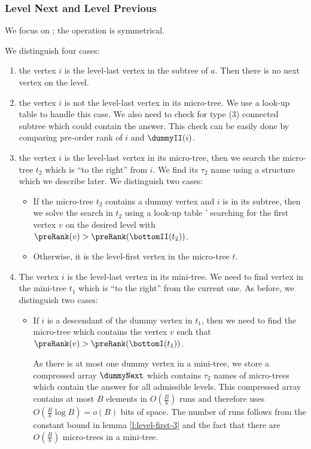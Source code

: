 \subsubsection{Level Next and Level Previous}

We focus on \levelNext{}; the operation \levelPrev{} is symmetrical.

We distinguish four cases:
\begin{enumerate}
	\item the vertex $i$ is the level-last vertex in the subtree of $a$.
	Then there is no next vertex on the level.
	
	\item the vertex $i$ is not the level-last vertex in its micro-tree.
	We use a look-up table to handle this case.
	We also need to check for type (3) connected subtree which could contain the answer.
	This check can be easily done by comparing pre-order rank of $i$ and $\dummyII(i)$.
	
	\item the vertex $i$ is the level-last vertex in its micro-tree, then we search the micro-tree $t_2$ which is ``to the right'' from $i$.
	We find its $\tau_2$ name using a structure which we describe later.
	We distinguish two cases:
	\begin{itemize}
		\item If the micro-tree $t_2$ contains a dummy vertex and $i$ is in its subtree, then we solve the search in $t_2$ using a look-up table \levelNext' searching for the first vertex $v$ on the desired level with $\preRank(v) > \preRank(\bottomII(t_2))$.
		\item Otherwise, it is the level-first vertex in the micro-tree $t$.
	\end{itemize}

	\item The vertex $i$ is the level-last vertex in its mini-tree.
	We need to find vertex in the mini-tree $t_1$ which is ``to the right'' from the current one.
	As before, we distinguish two cases:
	\begin{itemize}
		\item If $i$ is a descendant of the dummy vertex in $t_1$, then we need to find the micro-tree which contains the vertex $v$ such that $\preRank(v) > \preRank(\bottomI(t_1))$.
		
		As there is at most one dummy vertex in a mini-tree, we store a compressed array $\dummyNext$ which contains $\tau_2$ names of micro-trees which contain the answer for all admissible levels.
		This compressed array contains at most $B$ elements in $O\left(\frac{B}{b}\right)$ runs and therefore uses $O\left(\frac{B}{b} \log B\right) = o(B)$ bits of space.
		The number of runs follows from the constant bound in lemma \ref{l:level-first-3} and the fact that there are $O(\frac{B}{b})$ micro-trees in a mini-tree.


\end{itemize}
\end{enumerate}
